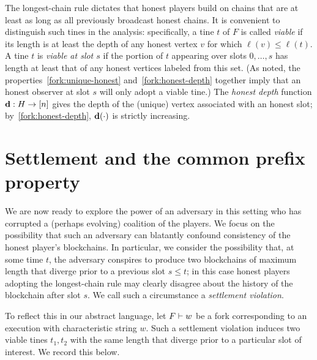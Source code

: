  The longest-chain rule dictates that honest players build on chains
 that are at least as long as all previously broadcast honest
 chains. It is convenient to distinguish such tines in the analysis:
 specifically, a tine $t$ of $F$ is called \emph{viable} if its length
 is at least the depth of any honest vertex $v$ for which
 $\ell(v) \leq \ell(t)$. A tine $t$ is \emph{viable at slot $s$} if
 the portion of $t$ appearing over slots $0,\ldots, s$ has length at
 least that of any honest vertices labeled from this set. (As noted,
 the properties~\ref{fork:unique-honest} and~\ref{fork:honest-depth}
 together imply that an honest observer at slot $s$ will only adopt a
 viable tine.)  The \emph{honest depth} function
 $\mathbf{d} : H \rightarrow [n]$ gives the depth of the (unique) vertex
 associated with an honest slot; by~\ref{fork:honest-depth},
 $\mathbf{d}(\cdot)$ is strictly increasing.
  
  \section{Settlement and the common prefix
    property}\label{sec:cp-settlement}
  
  We are now ready to explore the power of an adversary in this
  setting who has corrupted a (perhaps evolving) coalition of the
  players. We focus on the possibility that such an adversary can
  blatantly confound consistency of the honest player's
  blockchains. In particular, we consider the possibility that, at
  some time $t$, the adversary conspires to produce two blockchains of
  maximum length that diverge prior to a previous slot $s \leq t$; in
  this case honest players adopting the longest-chain rule may clearly
  disagree about the history of the blockchain after slot $s$. We call
  such a circumstance a \emph{settlement violation}.

  To reflect this in our abstract language, let $F \vdash w$ be a fork
  corresponding to an execution with characteristic string $w$. Such a
  settlement violation induces two viable tines $t_1, t_2$ with the
  same length that diverge prior to a particular slot of interest. We
  record this below.
  
